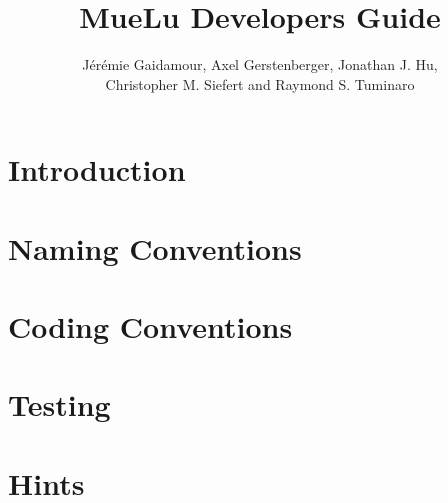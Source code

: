 \documentclass{article}
\title{MueLu Developers Guide}
\author{J\'er\'emie Gaidamour, Axel Gerstenberger, Jonathan J. Hu,\\
        Christopher M. Siefert and  Raymond S. Tuminaro}
\begin{document}

\maketitle

\begin{abstract}

\end{abstract}

\pagestyle{myheadings} \thispagestyle{plain} 

\section{Introduction}\label{sec:introduction}


\section{Naming Conventions}\label{sec:naming conventions}


\section{Coding Conventions}\label{sec:coding conventions}


\section{Testing}\label{sec:testing}


\section{Hints}\label{sec:hints}



 
\end{document}
